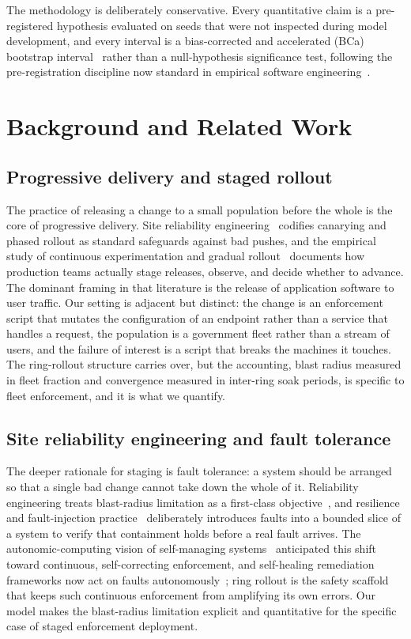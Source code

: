 \documentclass[journal]{IEEEtran}
\begin{document}
The methodology is deliberately conservative. Every quantitative claim is a pre-registered
hypothesis evaluated on seeds that were not inspected during model development, and every interval is
a bias-corrected and accelerated (BCa) bootstrap
interval~\cite{efron1987bca,efron1994introduction} rather than a null-hypothesis significance test,
following the pre-registration discipline now standard in empirical software
engineering~\cite{wohlin2012experimentation}.

\section{Background and Related Work}

\subsection{Progressive delivery and staged rollout}
The practice of releasing a change to a small population before the whole is the core of progressive
delivery. Site reliability engineering~\cite{beyer2016sre} codifies canarying and phased rollout as
standard safeguards against bad pushes, and the empirical study of continuous experimentation and
gradual rollout~\cite{schermann2018live} documents how production teams actually stage releases,
observe, and decide whether to advance. The dominant framing in that literature is the release of
application software to user traffic. Our setting is adjacent but distinct: the change is an
enforcement script that mutates the configuration of an endpoint rather than a service that handles a
request, the population is a government fleet rather than a stream of users, and the failure of
interest is a script that breaks the machines it touches. The ring-rollout structure carries over,
but the accounting, blast radius measured in fleet fraction and convergence measured in inter-ring
soak periods, is specific to fleet enforcement, and it is what we quantify.

\subsection{Site reliability engineering and fault tolerance}
The deeper rationale for staging is fault tolerance: a system should be arranged so that a single
bad change cannot take down the whole of it. Reliability engineering treats blast-radius limitation
as a first-class objective~\cite{beyer2016sre}, and resilience and fault-injection
practice~\cite{basiri2016chaos} deliberately introduces faults into a bounded slice of a system to
verify that containment holds before a real fault arrives. The autonomic-computing vision of
self-managing systems~\cite{kephart2003vision} anticipated this shift toward continuous,
self-correcting enforcement, and self-healing remediation frameworks now act on faults
autonomously~\cite{paper10autoheal}; ring rollout is the safety scaffold that keeps such continuous
enforcement from amplifying its own errors. Our model makes the blast-radius limitation explicit and
quantitative for the specific case of staged enforcement deployment.
\end{document}

